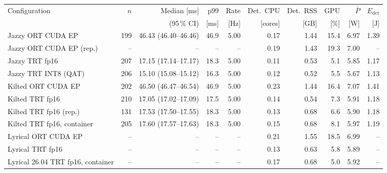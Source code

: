 \begin{tabular}{@{}lrrrrrrrrr@{}}
\toprule
Configuration & $n$ & Median [ms] & p99 & Rate & Det.\ CPU & Det.\ RSS & GPU & $\bar P$ & $E_{\mathrm{det}}$ \\
 & & (95\,\% CI) & [ms] & [Hz] & [cores] & [GB] & [\%] & [W] & [J] \\
\midrule
Jazzy ORT CUDA EP & 199 & 46.43 (46.40--46.46) & 46.9 & 5.00 & 0.17 & 1.44 & 15.4 & 6.97 & 1.39 \\
Jazzy ORT CUDA EP (rep.) & -- & -- & -- & -- & 0.19 & 1.43 & 19.3 & 7.00 & -- \\
Jazzy TRT fp16 & 207 & 17.15 (17.14--17.17) & 18.3 & 5.00 & 0.11 & 0.53 & 5.1 & 5.85 & 1.17 \\
Jazzy TRT INT8 (QAT) & 206 & 15.10 (15.08--15.12) & 16.3 & 5.00 & 0.12 & 0.52 & 5.5 & 5.67 & 1.13 \\
Kilted ORT CUDA EP & 202 & 46.50 (46.47--46.54) & 46.9 & 5.00 & 0.23 & 1.44 & 16.4 & 7.07 & 1.41 \\
Kilted TRT fp16 & 210 & 17.05 (17.02--17.09) & 17.5 & 5.00 & 0.14 & 0.54 & 7.3 & 5.91 & 1.18 \\
Kilted TRT fp16 (rep.) & 131 & 17.53 (17.50--17.55) & 18.3 & 5.00 & 0.13 & 0.68 & 6.6 & 5.90 & 1.18 \\
Kilted TRT fp16, container & 205 & 17.60 (17.57--17.63) & 18.3 & 5.00 & 0.15 & 0.68 & 8.1 & 5.97 & 1.19 \\
Lyrical ORT CUDA EP & -- & -- & -- & -- & 0.21 & 1.55 & 18.5 & 6.99 & -- \\
Lyrical TRT fp16 & -- & -- & -- & -- & 0.13 & 0.63 & 5.8 & 5.89 & -- \\
Lyrical 26.04 TRT fp16, container & -- & -- & -- & -- & 0.17 & 0.68 & 5.0 & 5.92 & -- \\
\bottomrule
\end{tabular}
